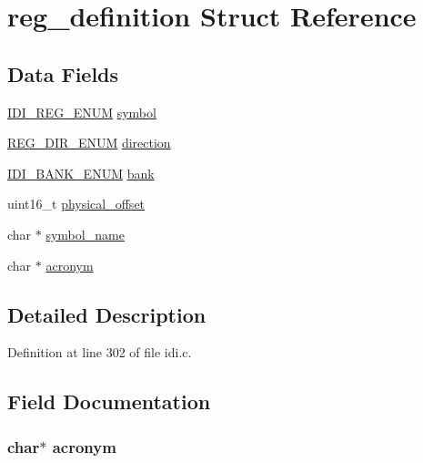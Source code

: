 \hypertarget{structreg__definition}{\section{reg\+\_\+definition Struct Reference}
\label{structreg__definition}
}
\subsection*{Data Fields}
\begin{DoxyCompactItemize}
\item 
\hyperlink{idi_8c_a3bd0ce53eda9237f7ec1a515f89e907b}{I\+D\+I\+\_\+\+R\+E\+G\+\_\+\+E\+N\+U\+M} \hyperlink{structreg__definition_a51dc88ef979cd6db270b6d5dda52e0b6}{symbol}
\item 
\hyperlink{idi_8c_adaff99746c6b7de99d49bf298156b6f5}{R\+E\+G\+\_\+\+D\+I\+R\+\_\+\+E\+N\+U\+M} \hyperlink{structreg__definition_a5f2826360f9ae88dfb5a673d9c4bfebe}{direction}
\item 
\hyperlink{idi_8c_a1a51d688850609ce7bdd228893d5ce77}{I\+D\+I\+\_\+\+B\+A\+N\+K\+\_\+\+E\+N\+U\+M} \hyperlink{structreg__definition_a09e69f821de1fa6dc424798a7a3dec86}{bank}
\item 
uint16\+\_\+t \hyperlink{structreg__definition_ad01d09ace616a7eef1498e2c04ad6e6d}{physical\+\_\+offset}
\item 
char $\ast$ \hyperlink{structreg__definition_a7e9d3f82b1d2ab1009d4df11f1ba7db6}{symbol\+\_\+name}
\item 
char $\ast$ \hyperlink{structreg__definition_a2a2bd3185ded23ec5bf2964bac848b7f}{acronym}
\end{DoxyCompactItemize}


\subsection{Detailed Description}


Definition at line 302 of file idi.\+c.



\subsection{Field Documentation}
\hypertarget{structreg__definition_a2a2bd3185ded23ec5bf2964bac848b7f}{
\subsubsection[{acronym}]{\setlength{\rightskip}{0pt plus 5cm}char$\ast$ acronym}}\label{structreg__definition_a2a2bd3185ded23ec5bf2964bac848b7f}


